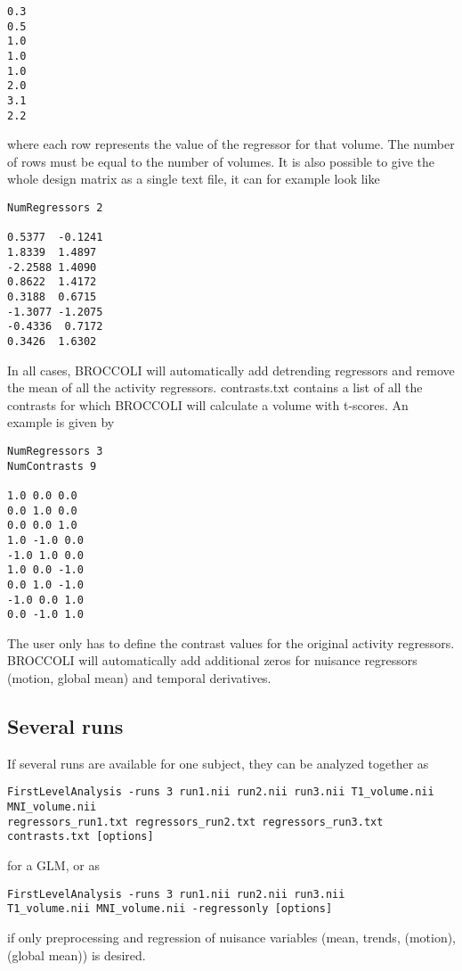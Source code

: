 \begin{verbatim}
0.3
0.5
1.0
1.0
1.0
2.0
3.1
2.2
\end{verbatim}
where each row represents the value of the regressor for that volume. The number of rows must be equal to the number of volumes. It is also possible to give the whole design matrix as a single text file, it can for example look like
\begin{verbatim}
NumRegressors 2

0.5377  -0.1241	
1.8339  1.4897
-2.2588 1.4090
0.8622  1.4172
0.3188  0.6715
-1.3077 -1.2075	
-0.4336  0.7172
0.3426  1.6302
\end{verbatim}
In all cases, BROCCOLI will automatically add detrending regressors and remove the mean of all the activity regressors. \newline \newline contrasts.txt contains a list of all the contrasts for which BROCCOLI will calculate a volume with t-scores. An example is given by

\begin{verbatim}
NumRegressors 3
NumContrasts 9

1.0 0.0 0.0
0.0 1.0 0.0
0.0 0.0 1.0
1.0 -1.0 0.0
-1.0 1.0 0.0
1.0 0.0 -1.0
0.0 1.0 -1.0
-1.0 0.0 1.0
0.0 -1.0 1.0
\end{verbatim}
The user only has to define the contrast values for the original activity regressors. BROCCOLI will automatically add additional zeros for nuisance regressors (motion, global mean) and temporal derivatives.


\subsection{Several runs}

If several runs are available for one subject, they can be analyzed together as
\begin{verbatim}
FirstLevelAnalysis -runs 3 run1.nii run2.nii run3.nii T1_volume.nii MNI_volume.nii 
regressors_run1.txt regressors_run2.txt regressors_run3.txt contrasts.txt [options]
\end{verbatim}
for a GLM, or as
\begin{verbatim}
FirstLevelAnalysis -runs 3 run1.nii run2.nii run3.nii 
T1_volume.nii MNI_volume.nii -regressonly [options]
\end{verbatim}
if only preprocessing and regression of nuisance variables (mean, trends, (motion), (global mean)) is desired. \\

